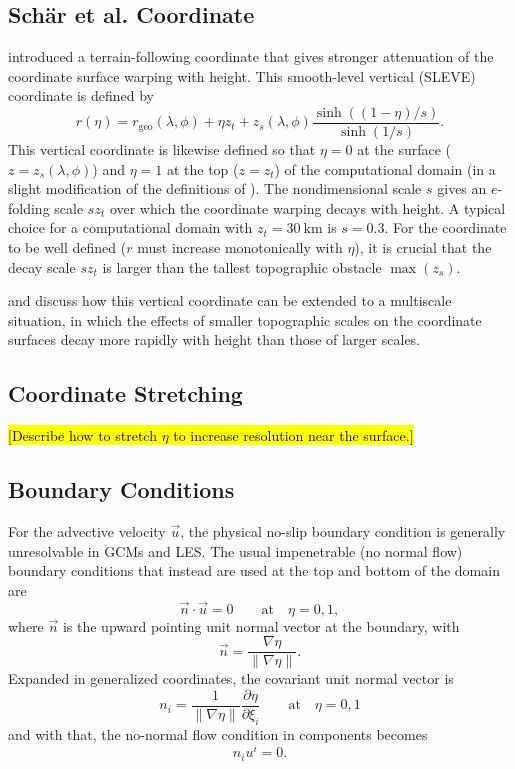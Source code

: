 \documentclass{report}
\begin{document}
\subsection{Sch\"ar et al. Coordinate} \citet{Schar02a} introduced a terrain-following coordinate that gives stronger attenuation of the coordinate surface warping with height. This smooth-level vertical (SLEVE) coordinate is defined by
\begin{equation}\label{e:Schaer}
    r(\eta) = r_\mathrm{geo}(\lambda,\phi) +  \eta z_t + z_s(\lambda,\phi) \frac{\sinh\left((1-\eta)/s\right)}{\sinh(1/s)}.
\end{equation}
This vertical coordinate is likewise defined so that  $\eta = 0$ at the surface ($z=z_s(\lambda, \phi)$) and $\eta = 1$ at the top ($z=z_t$) of the computational domain (in a slight modification of the definitions of \citet{Schar02a}). The nondimensional scale $s$ gives an $e$-folding scale $s z_t$ over which the coordinate warping  decays with height. A typical choice for a computational domain with $z_t = 30~\mathrm{km}$ is $s=0.3$. For the coordinate to be well defined ($r$ must increase monotonically with $\eta$), it is crucial that the decay scale $s z_t$ is larger than the tallest topographic obstacle $\max(z_s)$. 

\citet{Schar02a} and \citet{Leuenberger10q} discuss how this vertical coordinate can be extended to a multiscale situation, in which the effects of smaller topographic scales on the coordinate surfaces decay more rapidly with height than those of larger scales.  

\subsection{Coordinate Stretching} \hl{[Describe how to stretch $\eta$ to increase resolution near the surface.]}

\subsection{Boundary Conditions} For the advective velocity $\vec{u}$, the physical no-slip boundary condition is generally unresolvable in GCMs and LES. The usual impenetrable (no normal flow) boundary conditions that instead are used at the top and bottom of the domain are 
\[
\vec{n} \cdot \vec{u} = 0 \qquad \text{at} \quad \eta = 0, 1,
\]
where $\vec{n}$ is the upward pointing unit normal vector at the boundary, with 
\[
\vec{n} = \frac{\nabla \eta}{\|\nabla \eta\|}. 
\]
Expanded in generalized coordinates, the covariant unit normal vector is
\[
n_i = \frac{1}{\|\nabla\eta\|} \frac{\partial\eta}{\partial \xi_i} \qquad \text{at} \quad \eta = 0, 1
\]
and with that, the no-normal flow condition in components becomes
\[
n_i u^i = 0.
\]
\end{document}
